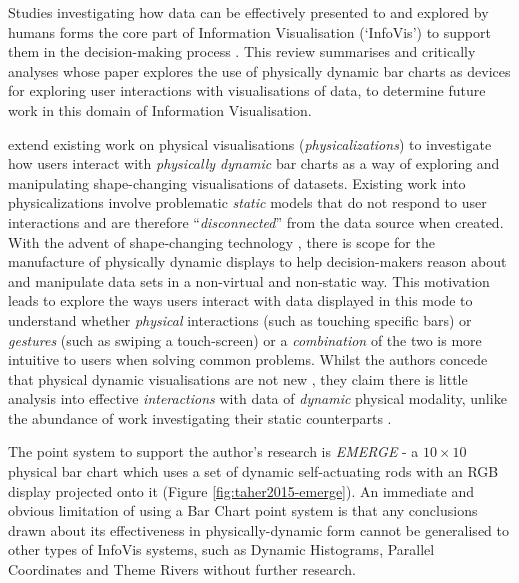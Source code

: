 \documentclass[11pt]{article}
\begin{document}

Studies investigating how data can be effectively presented to and explored by humans forms the core part of Information Visualisation (`InfoVis') to support them in the decision-making process \citep{card1997}. This review summarises and critically analyses \citet{taher2015} whose paper explores the use of physically dynamic bar charts as devices for exploring user interactions with visualisations of data, to determine future work in this domain of Information Visualisation.

\citeauthor{taher2015} extend existing work on physical visualisations (\textit{physicalizations}) \citep{jansen2015} to investigate how users interact with \textit{physically dynamic} bar charts as a way of exploring and manipulating shape-changing visualisations of datasets. Existing work into physicalizations involve problematic \textit{static} models that do not respond to user interactions \citep{jansen2013} and are therefore ``\textit{disconnected}'' from the data source when created. With the advent of shape-changing technology \citep{rasmussen2012}, there is scope for the manufacture of physically dynamic displays to help decision-makers reason about and manipulate data sets in a non-virtual and non-static way. This motivation leads \citeauthor{taher2015} to explore the ways users interact with data displayed in this mode to understand whether \textit{physical} interactions (such as touching specific bars) or \textit{gestures} (such as swiping a touch-screen) or a \textit{combination} of the two is more intuitive to users when solving common problems. Whilst the authors concede that physical dynamic visualisations are not new \citep{leithinger2010,follmer2013}, they claim there is little analysis into effective \textit{interactions} with data of \textit{dynamic} physical modality, unlike the abundance of work investigating their static counterparts \citep{stusak2014}.

The point system to support the author's research is \textit{EMERGE} - a $10\times10$ physical bar chart which uses a set of dynamic self-actuating rods with an RGB display projected onto it (Figure \ref{fig:taher2015-emerge}). An immediate and obvious limitation of using a Bar Chart point system is that any conclusions drawn about its effectiveness in physically-dynamic form cannot be generalised to other types of InfoVis systems, such as Dynamic Histograms, Parallel Coordinates and Theme Rivers without further research. 
\end{document}
